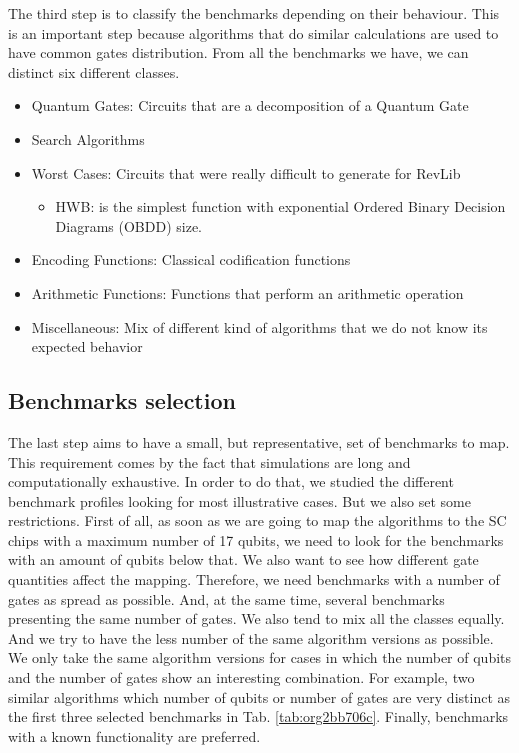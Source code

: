 The third step is to classify the benchmarks depending on their behaviour.
This is an important step because algorithms that do similar calculations are used to have common gates distribution.
From all the benchmarks we have, we can distinct six different classes.

\begin{itemize}
\item Quantum Gates: Circuits that are a decomposition of a Quantum Gate
\item Search Algorithms
\item Worst Cases: Circuits that were really difficult to generate for RevLib
\begin{itemize}
\item HWB: is the simplest function with exponential Ordered Binary Decision Diagrams (OBDD) size.
\end{itemize}
\item Encoding Functions: Classical codification functions
\item Arithmetic Functions: Functions that perform an arithmetic operation
\item Miscellaneous: Mix of different kind of algorithms that we do not know its expected behavior
\end{itemize}


\subsection*{Benchmarks selection}
\label{sec:org09015e5}

The last step aims to have a small, but representative, set of benchmarks to map.
This requirement comes by the fact that simulations are long and computationally exhaustive.
In order to do that, we studied the different benchmark profiles looking for most illustrative cases.
But we also set some restrictions.
First of all, as soon as we are going to map the algorithms to the SC chips with a maximum number of 17 qubits, we need to look for the benchmarks with an amount of qubits below that.
We also want to see how different gate quantities affect the mapping.
Therefore, we need benchmarks with a number of gates as spread as possible.
And, at the same time, several benchmarks presenting the same number of gates.
We also tend to mix all the classes equally.
And we try to have the less number of the same algorithm versions as possible.
We only take the same algorithm versions for cases in which the number of qubits and the number of gates show an interesting combination.
For example, two similar algorithms which number of qubits or number of gates are very distinct as the first three selected benchmarks in Tab. \ref{tab:org2bb706c}.
Finally, benchmarks with a known functionality are preferred.

